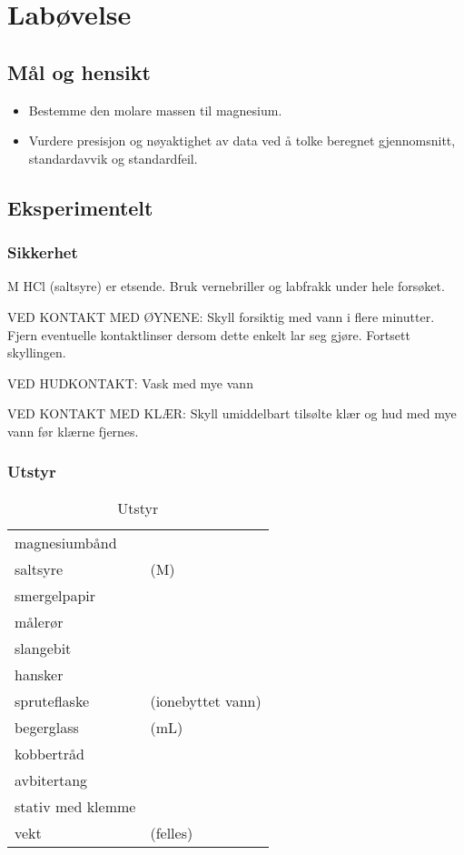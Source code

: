 \documentclass[12pt, a4]{article}
\begin{document}
	\clearpage
	
	\section{Labøvelse}
	
	\subsection{Mål og hensikt}
	\begin{itemize}
		\item Bestemme den molare massen til magnesium.
		\item Vurdere presisjon og nøyaktighet av data ved å tolke beregnet gjennomsnitt, standardavvik og standardfeil.
	\end{itemize}
	
	\subsection{Eksperimentelt}
	
	\subsubsection{Sikkerhet}
	\unit[6]{M} HCl (saltsyre) er etsende. Bruk vernebriller og labfrakk under hele forsøket.
	
	VED KONTAKT MED ØYNENE: Skyll forsiktig med vann i flere minutter. Fjern eventuelle kontaktlinser dersom dette enkelt lar seg gjøre. Fortsett skyllingen.
	
	VED HUDKONTAKT: Vask med mye vann
	
	VED KONTAKT MED KLÆR: Skyll umiddelbart tilsølte klær og hud med mye vann før klærne fjernes. 
	
	\subsubsection{Utstyr}
	
	\begin{table}[htpb]
		\caption{Utstyr}
		\label{equipment}
		\begin{tabular}{ll}
			\toprule
			magnesiumbånd & \\ 
			saltsyre & (\unit[6]{M}) \\
			smergelpapir & \\
			målerør & \\
			slangebit & \\
			hansker & \\
			spruteflaske & (ionebyttet vann) \\
			begerglass & (\unit[150]{mL}) \\
			kobbertråd & \\
			avbitertang & \\ 
			stativ med klemme & \\ 
			vekt & (felles) \\ \bottomrule 
		\end{tabular}
	\end{table}
	
\end{document}
